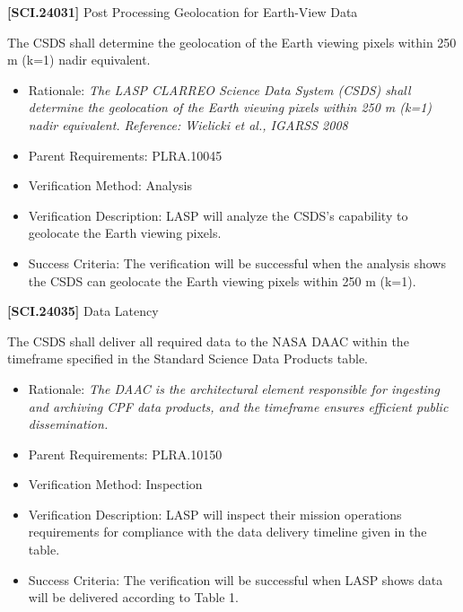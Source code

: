 \textbf{[SCI.24031]} Post Processing Geolocation for Earth-View Data

The \gls{CSDS} shall determine the geolocation of the Earth viewing pixels within 250 m (k=1) nadir equivalent.

\begin{itemize}
\item{} Rationale: \emph{The LASP CLARREO Science Data System (CSDS) shall determine the geolocation of the Earth viewing pixels within 250 m (k=1) nadir equivalent. Reference: Wielicki et al., IGARSS 2008}

\item{} Parent Requirements: PLRA.10045

\item{} Verification Method: Analysis

\item{} Verification Description: \gls{LASP} will analyze the \gls{CSDS}'s capability to geolocate the Earth viewing pixels.

\item{} Success Criteria: The verification will be successful when the \gls{analysis} shows the \gls{CSDS} can geolocate the Earth viewing pixels within 250 m (k=1).

\end{itemize}

\textbf{[SCI.24035]} Data Latency

The \gls{CSDS} shall deliver all required data to the NASA \gls{DAAC} within the timeframe specified in the Standard Science Data Products table.

\begin{itemize}
\item{} Rationale: \emph{The DAAC is the architectural element responsible for ingesting and archiving CPF data products, and the timeframe ensures efficient public dissemination.}

\item{} Parent Requirements: PLRA.10150

\item{} Verification Method: Inspection

\item{} Verification Description: \gls{LASP} will inspect their mission operations requirements for compliance with the data delivery timeline given in the table.

\item{} Success Criteria: The verification will be successful when \gls{LASP} shows data will be delivered according to Table 1.

\end{itemize}

